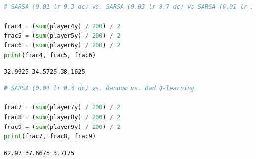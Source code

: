 \begin{lstlisting}[language=Python]
# SARSA (0.01 lr 0.3 dc) vs. SARSA (0.03 lr 0.7 dc) vs SARSA (0.01 lr 1 dc)

frac4 = (sum(player4y) / 200) / 2
frac5 = (sum(player5y) / 200) / 2
frac6 = (sum(player6y) / 200) / 2
print(frac4, frac5, frac6)
\end{lstlisting}

\begin{lstlisting}
32.9925 34.5725 38.1625
\end{lstlisting}

\begin{lstlisting}[language=Python]
# SARSA (0.01 lr 0.3 dc) vs. Random vs. Bad Q-learning

frac7 = (sum(player7y) / 200) / 2
frac8 = (sum(player8y) / 200) / 2
frac9 = (sum(player9y) / 200) / 2
print(frac7, frac8, frac9)
\end{lstlisting}

\begin{lstlisting}
62.97 37.6675 3.7175
\end{lstlisting}
